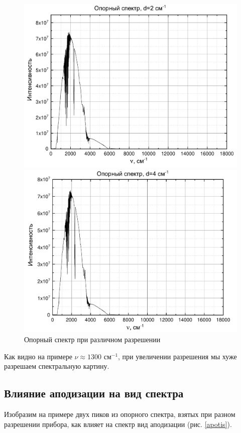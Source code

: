 \begin{figure}[h]
\begin{minipage}[h!]{0.5\linewidth}
		\includegraphics[width=1\linewidth]{data/opor_2}
	\end{minipage}
	\begin{minipage}[h!]{0.5\linewidth}
		\centering
		\includegraphics[width=1\linewidth]{data/opor_4}
	\end{minipage}
	\caption{Опорный спектр при различном разрешении}
	\label{resolution}
\end{figure}





Как видно на примере $\nu \approx 1300 \text{ см}^{-1}$, при увеличении разрешения мы хуже разрешаем спектральную картину.
\subsection{Влияние аподизации на вид спектра}
Изобразим на примере двух пиков из опорного спектра, взятых при разном разрешении прибора, как влияет на спектр вид аподизации (рис. \ref{apotis}).

